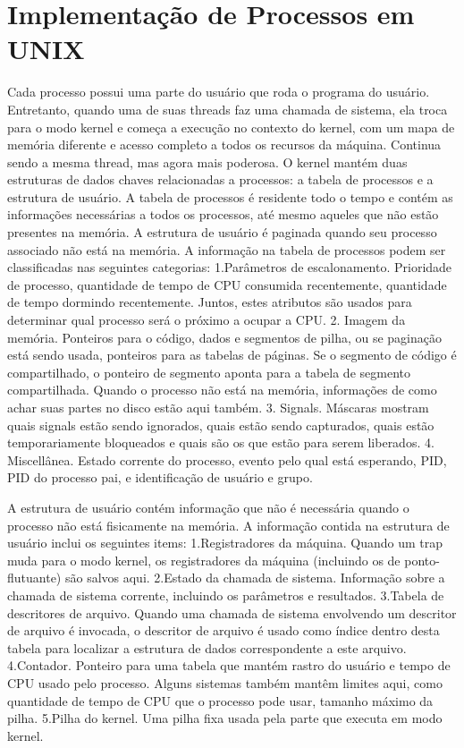 \section{Implementação de Processos em UNIX}
Cada processo possui uma parte do usuário que roda o programa do usuário. Entretanto, quando uma de suas threads faz uma chamada de sistema, ela troca para o modo kernel e começa a execução no contexto do kernel, com um mapa de memória diferente e acesso completo a todos os recursos da máquina.
Continua sendo a mesma thread, mas agora mais poderosa. O kernel mantém duas estruturas de dados chaves relacionadas a processos: a tabela de processos e a estrutura de usuário. A tabela de processos é residente todo o tempo e contém as informações necessárias a todos os processos, até mesmo aqueles que não estão presentes na memória. A estrutura de usuário é paginada quando seu processo associado não está na memória.
A informação na tabela de processos podem ser classificadas nas seguintes categorias:
1.Parâmetros de escalonamento. Prioridade de processo, quantidade de tempo de CPU consumida recentemente, quantidade de tempo dormindo recentemente. Juntos, estes atributos são usados para determinar qual processo será o próximo a ocupar a CPU.
2.	Imagem da memória. Ponteiros para o código, dados e segmentos de pilha, ou se 	paginação está sendo usada, ponteiros para as tabelas de páginas. Se o segmento de 	código é compartilhado, o ponteiro de segmento aponta para a tabela de segmento 	compartilhada. Quando o processo não está na memória, informações de como achar suas 	partes no disco estão aqui também.
3.	Signals. Máscaras mostram quais signals estão sendo ignorados, quais estão sendo 	capturados, quais estão temporariamente bloqueados e quais são os que estão para serem 	liberados. 
4.	Miscellânea. Estado corrente do processo, evento pelo qual está esperando, PID, PID do 	processo pai, e identificação de usuário e grupo.

A estrutura de usuário contém informação que não é necessária quando o processo não está fisicamente na memória. A informação contida na estrutura de usuário inclui os seguintes items:
1.Registradores da máquina. Quando um trap muda para o modo kernel, os registradores da máquina (incluindo os de ponto-flutuante) são salvos aqui.
2.Estado da chamada de sistema. Informação sobre a chamada de sistema corrente, incluindo os parâmetros e resultados.
3.Tabela de descritores de arquivo. Quando uma chamada de sistema envolvendo um descritor de arquivo é invocada, o descritor de arquivo é  usado como índice dentro desta tabela para localizar a estrutura de dados  correspondente a este arquivo. 
4.Contador. Ponteiro para uma tabela que mantém rastro do usuário e tempo de CPU usado pelo processo. Alguns sistemas também mantêm limites  aqui, como quantidade de tempo de CPU que o processo pode usar, tamanho máximo da pilha.
5.Pilha do kernel. Uma pilha fixa usada pela parte que executa em modo kernel.

